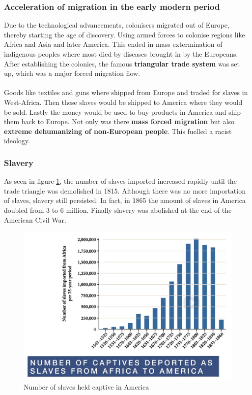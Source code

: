 \documentclass[../summary.tex]{subfiles}
\begin{document}
	\subsubsection{Acceleration of migration in the early modern period}
	Due to the technological advancements, colonisers migrated out of Europe, thereby starting the age of discovery. Using armed forces to colonise regions like Africa and Asia and later America. This ended in mass extermination of indigenous peoples where most died by diseases brought in by the Europeans. After establishing the colonies, the famous \textbf{triangular trade system} was set up, which was a major forced migration flow. 
	\\\\
	Goods like textiles and guns where shipped from Europe and traded for slaves in West-Africa. Then these slaves would be shipped to America where they would be sold. Lastly the money would be used to buy products in America and ship them back to Europe. Not only was there \textbf{mass forced migration} but also \textbf{extreme dehumanizing of non-European people}. This fuelled a racist ideology. 
	\newpage
	\subsubsection{Slavery}
	As seen in figure \ref{fig:7-slaves-captive}, the number of slaves imported increased rapidly until the trade triangle was demolished in 1815. Although there was no more importation of slaves, slavery still persisted. In fact, in 1865 the amount of slaves in America doubled from 3 to 6 million. Finally slavery was abolished at the end of the American Civil War.
	
	\begin{figure}[h]
		\centering
		\includegraphics[width=0.7\linewidth]{../images/7-slaves-captive}
		\caption{Number of slaves held captive in America}
		\label{fig:7-slaves-captive}
	\end{figure}
	
\end{document}
